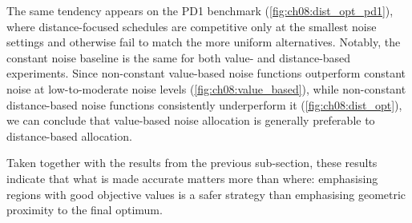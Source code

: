 The same tendency appears on the PD1 benchmark (\cref{fig:ch08:dist_opt_pd1}), where distance-focused schedules are competitive only at the smallest noise settings and otherwise fail to match the more uniform alternatives. Notably, the constant noise baseline is the same for both value- and distance-based experiments. Since non-constant value-based noise functions outperform constant noise at low-to-moderate noise levels (\cref{fig:ch08:value_based}), while non-constant distance-based noise functions consistently underperform it (\cref{fig:ch08:dist_opt}), we can conclude that value-based noise allocation is generally preferable to distance-based allocation.

Taken together with the results from the previous sub-section, these results indicate that what is made accurate matters more than where: emphasising regions with good objective values is a safer strategy than emphasising geometric proximity to the final optimum.

